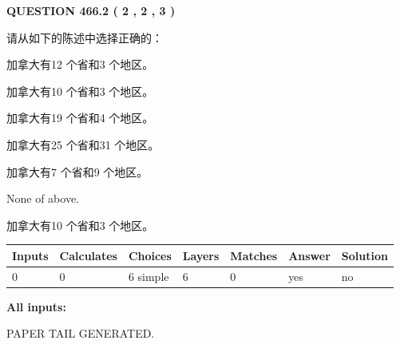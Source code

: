 \documentclass{ctexart}
\begin{document}
   
  
\vspace{0.2in}
  
{\textbf{\Large{QUESTION
466.2 
 ( 2 , 2 , 3 )
}}}
  
  
请从如下的陈述中选择正确的：
 
 
加拿大有12 个省和3 个地区。
 
 
加拿大有10 个省和3 个地区。
 
 
加拿大有19 个省和4 个地区。
 
 
加拿大有25 个省和31 个地区。
 
 
加拿大有7 个省和9 个地区。
 
 
 None of above.
 
 
\noindent{}
 
 
加拿大有10 个省和3 个地区。
 
 
\noindent{}
 
 
   
   
   
   
\noindent\begin{tabular}{|l|l|l|l|l|l|l|}
 \hline
Inputs & Calculates & Choices & Layers & Matches & Answer & Solution \\ \hline
 0  & 
 0  & 
 6
  simple  
  & 
 6  & 
 0  & 
  yes & 
  no 
  \\ \hline
 \end{tabular}
   
   
   
   
\noindent{}
   
   
   
   
\noindent\vspace{0.1in}\hspace{-0.08in} {\textbf{\Large{All inputs: }}}
   
   
   
   
   
   
 \vspace{0.2in}
 
   
   
\vspace{2.0in} PAPER TAIL GENERATED.
   
\end{document}
